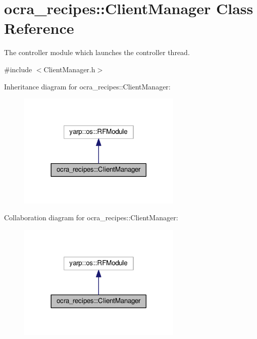 \hypertarget{classocra__recipes_1_1ClientManager}{}\section{ocra\+\_\+recipes\+:\+:Client\+Manager Class Reference}
\label{classocra__recipes_1_1ClientManager}


The controller module which launches the controller thread.  




{\ttfamily \#include $<$Client\+Manager.\+h$>$}



Inheritance diagram for ocra\+\_\+recipes\+:\+:Client\+Manager\+:
\nopagebreak
\begin{figure}[H]
\begin{center}
\leavevmode
\includegraphics[width=221pt]{d2/d4b/classocra__recipes_1_1ClientManager__inherit__graph}
\end{center}
\end{figure}


Collaboration diagram for ocra\+\_\+recipes\+:\+:Client\+Manager\+:
\nopagebreak
\begin{figure}[H]
\begin{center}
\leavevmode
\includegraphics[width=221pt]{dc/de0/classocra__recipes_1_1ClientManager__coll__graph}
\end{center}
\end{figure}
